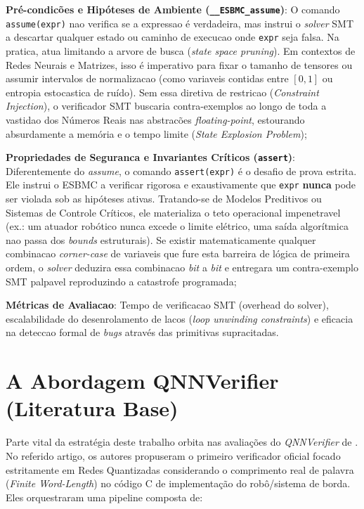 \begin{alineas}
    \item \textbf{Pr\'e-condic\~oes e Hip\'oteses de Ambiente (\texttt{\_\_ESBMC\_assume})}: O comando \texttt{assume(expr)} nao verifica se a expressao \'e verdadeira, mas instrui o \textit{solver} SMT a descartar qualquer estado ou caminho de execucao onde \texttt{expr} seja falsa. Na pratica, atua limitando a arvore de busca (\textit{state space pruning}). Em contextos de Redes Neurais e Matrizes, isso \'e imperativo para fixar o tamanho de tensores ou assumir intervalos de normalizacao (como variaveis contidas entre $[0,1]$ ou entropia estocastica de ru\'ido). Sem essa diretiva de restricao (\textit{Constraint Injection}), o verificador SMT buscaria contra-exemplos ao longo de toda a vastidao dos N\'umeros Reais nas abstrac\~oes \textit{floating-point}, estourando absurdamente a mem\'oria e o tempo limite (\textit{State Explosion Problem});
    \item \textbf{Propriedades de Seguranca e Invariantes Cr\'iticos (\texttt{assert})}: Diferentemente do \textit{assume}, o comando \texttt{assert(expr)} \'e o desafio de prova estrita. Ele instrui o ESBMC a verificar rigorosa e exaustivamente que \texttt{expr} \textbf{nunca} pode ser violada sob as hip\'oteses ativas. Tratando-se de Modelos Preditivos ou Sistemas de Controle Cr\'iticos, ele materializa o teto operacional impenetravel (ex.: um atuador rob\'otico nunca excede o limite el\'etrico, uma sa\'ida algor\'itmica nao passa dos \textit{bounds} estruturais). Se existir matematicamente qualquer combinacao \textit{corner-case} de variaveis que fure esta barreira de l\'ogica de primeira ordem, o \textit{solver} deduzira essa combinacao \textit{bit} a \textit{bit} e entregara um contra-exemplo SMT palpavel reproduzindo a catastrofe programada;
    \item \textbf{M\'etricas de Avaliacao}: Tempo de verificacao SMT (overhead do solver), escalabilidade do desenrolamento de lacos (\textit{loop unwinding constraints}) e eficacia na deteccao formal de \textit{bugs} atrav\'es das primitivas supracitadas.
\end{alineas}

\section{A Abordagem QNNVerifier (Literatura Base)}

Parte vital da estratégia deste trabalho orbita nas avaliações do \textit{QNNVerifier} de \cite{gopinath2021verifying}. No referido artigo, os autores propuseram o primeiro verificador oficial focado estritamente em Redes Quantizadas considerando o comprimento real de palavra (\textit{Finite Word-Length}) no código C de implementação do robô/sistema de borda. Eles orquestraram uma pipeline composta de:

